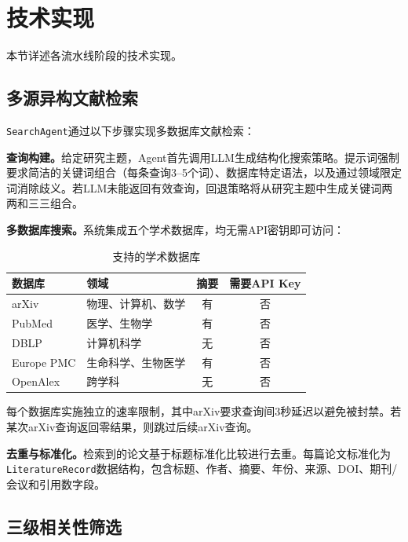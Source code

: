 \section{技术实现}
\label{sec:method}

本节详述各流水线阶段的技术实现。

\subsection{多源异构文献检索}
\label{sec:method-search}

\texttt{SearchAgent}通过以下步骤实现多数据库文献检索：

\textbf{查询构建。}给定研究主题，Agent首先调用LLM生成结构化搜索策略。提示词强制要求简洁的关键词组合（每条查询3--5个词）、数据库特定语法，以及通过领域限定词消除歧义。若LLM未能返回有效查询，回退策略将从研究主题中生成关键词两两和三三组合。

\textbf{多数据库搜索。}系统集成五个学术数据库，均无需API密钥即可访问：

\begin{table}[htbp]
    \centering
    \caption{支持的学术数据库}
    \label{tbl:databases}
    \begin{tabular}{llcc}
    \toprule
    数据库 & 领域 & 摘要 & 需要API Key \\
    \midrule
    arXiv       & 物理、计算机、数学     & 有 & 否 \\
    PubMed      & 医学、生物学           & 有 & 否 \\
    DBLP        & 计算机科学             & 无 & 否 \\
    Europe PMC  & 生命科学、生物医学     & 有 & 否 \\
    OpenAlex    & 跨学科                 & 无 & 否 \\
    \bottomrule
    \end{tabular}
\end{table}

每个数据库实施独立的速率限制，其中arXiv要求查询间3秒延迟以避免被封禁。若某次arXiv查询返回零结果，则跳过后续arXiv查询。

\textbf{去重与标准化。}检索到的论文基于标题标准化比较进行去重。每篇论文标准化为\texttt{LiteratureRecord}数据结构，包含标题、作者、摘要、年份、来源、DOI、期刊/会议和引用数字段。

\subsection{三级相关性筛选}
\label{sec:method-screen}

